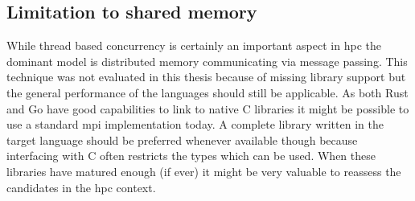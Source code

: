 \subsection*{Limitation to shared memory}
\label{subsec:Conclusion::Improvements::SharedMemory}

While thread based concurrency is certainly an important aspect in \gls{hpc} the dominant model is distributed memory communicating via message passing. This technique was not evaluated in this thesis because of missing library support but the general performance of the languages should still be applicable. As both Rust and Go have good capabilities to link to native C libraries it might be possible to use a standard \gls{mpi} implementation today. A complete library written in the target language should be preferred whenever available though because interfacing with C often restricts the types which can be used. When these libraries have matured enough (if ever) it might be very valuable to reassess the candidates in the \gls{hpc} context.
